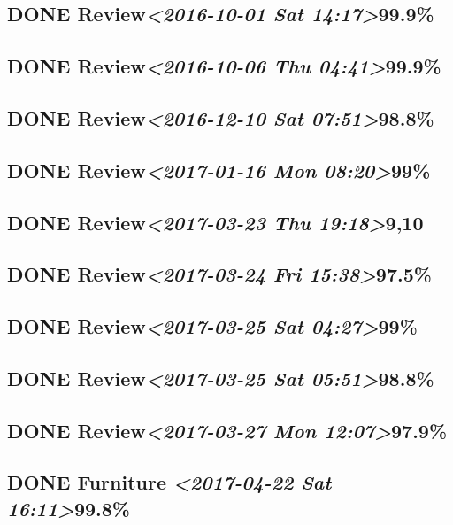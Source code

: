 \documentclass[11pt]{ctexart}
\begin{document}
\subsection{{\bfseries\sffamily DONE} Review\textit{<2016-10-01 Sat 14:17>}99.9\%}
\label{sec:org209f9dc}
\subsection{{\bfseries\sffamily DONE} Review\textit{<2016-10-06 Thu 04:41>}99.9\%}
\label{sec:org3dc1425}

\subsection{{\bfseries\sffamily DONE} Review\textit{<2016-12-10 Sat 07:51>}98.8\%}
\label{sec:org041f550}
\subsection{{\bfseries\sffamily DONE} Review\textit{<2017-01-16 Mon 08:20>}99\%}
\label{sec:org3149953}
\subsection{{\bfseries\sffamily DONE} Review\textit{<2017-03-23 Thu 19:18>}9,10}
\label{sec:org405d2d2}
\subsection{{\bfseries\sffamily DONE} Review\textit{<2017-03-24 Fri 15:38>}97.5\%}
\label{sec:org9b91579}
\subsection{{\bfseries\sffamily DONE} Review\textit{<2017-03-25 Sat 04:27>}99\%}
\label{sec:orgc3d799f}
\subsection{{\bfseries\sffamily DONE} Review\textit{<2017-03-25 Sat 05:51>}98.8\%}
\label{sec:org75d9f9b}

\subsection{{\bfseries\sffamily DONE} Review\textit{<2017-03-27 Mon 12:07>}97.9\%}
\label{sec:org3356d3c}
\subsection{{\bfseries\sffamily DONE} Furniture \textit{<2017-04-22 Sat 16:11>}99.8\%}
\label{sec:orgdaa00e4}
\end{document}
